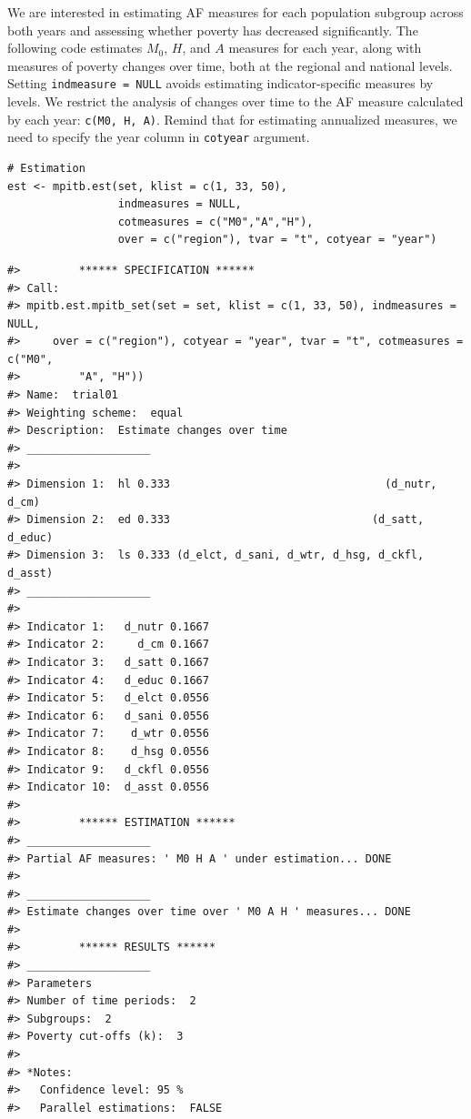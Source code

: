 We are interested in estimating AF measures for each population subgroup across both years and assessing whether poverty has decreased significantly. The following code estimates \(M_0\), \(H\), and \(A\) measures for each year, along with measures of poverty changes over time, both at the regional and national levels. Setting \texttt{indmeasure\ =\ NULL} avoids estimating indicator-specific measures by levels. We restrict the analysis of changes over time to the AF measure calculated by each year: \texttt{c(M0,\ H,\ A)}. Remind that for estimating annualized measures, we need to specify the year column in \texttt{cotyear} argument.

\begin{verbatim}
# Estimation
est <- mpitb.est(set, klist = c(1, 33, 50),
                 indmeasures = NULL,
                 cotmeasures = c("M0","A","H"),
                 over = c("region"), tvar = "t", cotyear = "year")
\end{verbatim}

\begin{verbatim}
#>         ****** SPECIFICATION ******
#> Call:
#> mpitb.est.mpitb_set(set = set, klist = c(1, 33, 50), indmeasures = NULL, 
#>     over = c("region"), cotyear = "year", tvar = "t", cotmeasures = c("M0", 
#>         "A", "H"))
#> Name:  trial01 
#> Weighting scheme:  equal 
#> Description:  Estimate changes over time 
#> ___________________
#>                                                                      
#> Dimension 1:  hl 0.333                                 (d_nutr, d_cm)
#> Dimension 2:  ed 0.333                               (d_satt, d_educ)
#> Dimension 3:  ls 0.333 (d_elct, d_sani, d_wtr, d_hsg, d_ckfl, d_asst)
#> ___________________
#>                             
#> Indicator 1:   d_nutr 0.1667
#> Indicator 2:     d_cm 0.1667
#> Indicator 3:   d_satt 0.1667
#> Indicator 4:   d_educ 0.1667
#> Indicator 5:   d_elct 0.0556
#> Indicator 6:   d_sani 0.0556
#> Indicator 7:    d_wtr 0.0556
#> Indicator 8:    d_hsg 0.0556
#> Indicator 9:   d_ckfl 0.0556
#> Indicator 10:  d_asst 0.0556
#> 
#>         ****** ESTIMATION ******
#> ___________________
#> Partial AF measures: ' M0 H A ' under estimation... DONE
#> 
#> ___________________
#> Estimate changes over time over ' M0 A H ' measures... DONE
#> 
#>         ****** RESULTS ******
#> ___________________
#> Parameters
#> Number of time periods:  2 
#> Subgroups:  2 
#> Poverty cut-offs (k):  3 
#> 
#> *Notes: 
#>   Confidence level: 95 %
#>   Parallel estimations:  FALSE
\end{verbatim}

